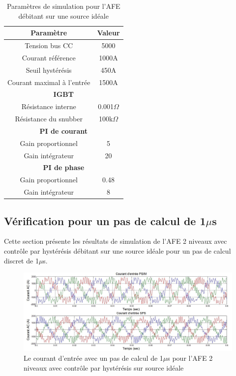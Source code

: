\documentclass[11pt,letterpaper,final]{report}
\begin{document}
\begin{table}[htb]
\centering
\begin{tabular}{|c|c|} 
  \hline
  \textbf{Paramètre} & \textbf{Valeur}  \\
  \hline\hline
  Tension bus CC & 5000\\ \hline
  Courant référence & 1000A\\ \hline
  Seuil hystérésis & 450A\\ \hline
  Courant maximal à l'entrée& 1500A \\ \hline \hline
  \multicolumn{2}{|c|}{\textbf{IGBT}}\\ \hline
  Résistance interne & 0.001$\Omega$\\
  Résistance du snubber & 100k$\Omega$\\ \hline \hline
   \multicolumn{2}{|c|}{\textbf{PI de courant}}\\ \hline
  Gain proportionnel & 5 \\
  Gain intégrateur & 20 \\ \hline \hline
  \multicolumn{2}{|c|}{\textbf{PI de phase}}\\ \hline
  Gain proportionnel & 0.48 \\
  Gain intégrateur & 8 \\ \hline \hline
  \hline
\end{tabular}
\caption{Paramètres de simulation pour l'AFE débitant sur une source idéale}
\label{p_AF_ID}
\end{table}

\subsection{Vérification pour un pas de calcul de 1$\mu$s}
Cette section présente les résultats de simulation de l'AFE 2 niveaux avec contrôle par hystérésis débitant sur une source idéale pour un pas de calcul discret de 1$\mu$s. 


\begin{figure}[htb]
\centering
\includegraphics[scale=0.5]{Fig/AFEIDEAL/CourantAC.jpg}
\caption{Le courant d'entrée avec un pas de calcul de 1$\mu$s pour l'AFE 2 niveaux avec contrôle par hystérésis sur source idéale}
\label{AF_I_cou}
\end{figure}
\end{document}
